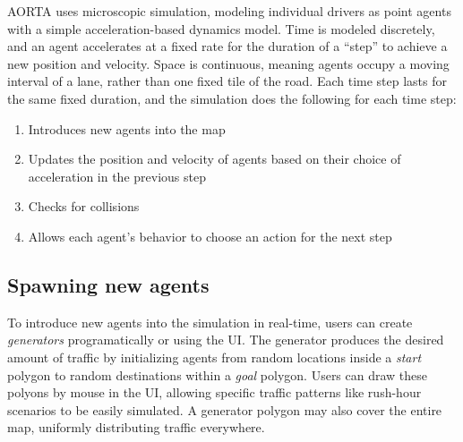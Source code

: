 \documentclass[letterpaper, 10 pt, conference]{ieeeconf}  %
\begin{document}
AORTA uses microscopic simulation, modeling individual drivers as point agents
with a simple acceleration-based dynamics model. Time is modeled discretely,
and an agent accelerates at a fixed rate for the duration of a ``step'' to
achieve a new position and velocity. Space is continuous, meaning agents occupy
a moving interval of a lane, rather than one fixed tile of the road. Each time
step lasts for the same fixed duration, and the simulation does the following
for each time step:

% 

\begin{enumerate}
  \item Introduces new agents into the map
  \item Updates the position and velocity of agents based on their choice of
        acceleration in the previous step
  \item Checks for collisions
  \item Allows each agent's behavior to choose an action for the next step
\end{enumerate}


\subsection{Spawning new agents}

To introduce new agents into the simulation in real-time, users can create
\emph{generators} programatically or using the UI. The generator produces the
desired amount of traffic by initializing agents from random locations inside a
\textit{start} polygon to random destinations within a \textit{goal} polygon.
Users can draw these polyons by mouse in the UI, allowing specific traffic
patterns like rush-hour scenarios to be easily simulated. A generator polygon
may also cover the entire map, uniformly distributing traffic everywhere.
\end{document}
